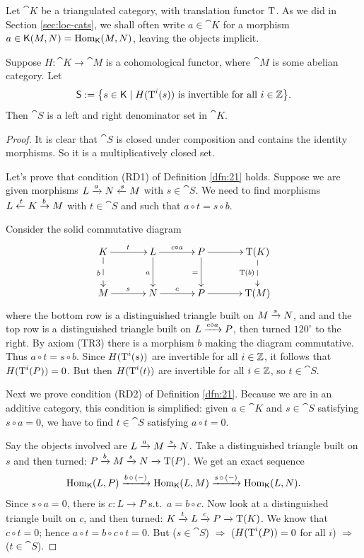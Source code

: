 
Let $\cat{K}$ be a triangulated category, with translation functor $\operatorname{T}$. 
As we did in Section \ref{sec:loc-cats}, we shall often write 
$a \in \cat{K}$ for a morphism 
$a \in \operatorname{\mathsf{K}}(M, N) = \operatorname{Hom}_{\operatorname{\mathsf{K}}}(M, N)$, leaving the objects 
implicit. 

\begin{prop} \label{prop:106}
Suppose 
$H : \cat{K} \to \cat{M}$ is a cohomological functor, where $\cat{M}$ is some
abelian category. Let 
\[ \operatorname{\mathsf{S}} := \bigl\{ s \in \operatorname{\mathsf{K}} \mid H( \operatorname{T}^i(s)) \textup{ is invertible 
for all } i \in \mathbb{Z} \bigr\} . \] 
Then $\cat{S}$ is a left and right denominator set in $\cat{K}$.
\end{prop}

\begin{proof}
It is clear that $\cat{S}$ is closed under composition and contains the
identity morphisms. So it is a multiplicatively closed set. 

Let's prove that condition (RD1) of Definition \ref{dfn:21} holds. Suppose we 
are given morphisms
$L \xrightarrow{a} N \xleftarrow{s} M$ with $s \in \cat{S}$. 
We need to find morphisms 
$L \xleftarrow{t} K \xrightarrow{b} M$ with $t \in \cat{S}$ and such that 
$a \circ t = s \circ b$.  
 
Consider the solid commutative diagram 
\[ \UseTips  \xymatrix @C=8ex @R=6ex { 
K
\ar[r]^{t}
\ar@{-->}[d]_{b}
&
L
\ar[r]^{c \circ a}
\ar[d]_{a}
& 
P
\ar[r]^{}
\ar[d]_{=}
& 
\opn{T}(K) 
\ar@{-->}[d]_{\opn{T}(b)}
\\
M
\ar[r]^{s}
&
N
\ar[r]^{c}
& 
P
\ar[r]^{}
&
\opn{T}(M) 
}  \]
where the bottom row is a distinguished triangle built on $M \xrightarrow{s} N$,
and and the top row is a distinguished triangle built on 
$L \xrightarrow{c \circ a} P$, then turned $120^\circ$ to the right. By axiom (TR3) 
there 
is a morphism $b$ making the diagram commutative. Thus 
$a \circ t = s \circ b$.  Since $H(\operatorname{T}^i(s))$ are
invertible for all $i \in \mathbb{Z}$, it follows that $H(\operatorname{T}^i(P)) = 0$. But 
then $H(\operatorname{T}^i(t))$ are invertible for all $i \in \mathbb{Z}$, so 
$t \in \cat{S}$. 

Next we prove condition (RD2) of Definition \ref{dfn:21}. Because we are in 
an additive category, this condition is simplified: given $a \in \cat{K}$ and 
$s \in \cat{S}$ satisfying 
$s \circ a = 0$, we have to find $t \in \cat{S}$ satisfying 
$a \circ t = 0$. 

Say the objects involved are $L \xrightarrow{a} M \xrightarrow{s} N$. 
Take a distinguished triangle built on $s$ and then turned:
$P \xrightarrow{b} M \xrightarrow{s} N \xrightarrow{} \operatorname{T}(P)$.
We get an exact sequence 
\[ \operatorname{Hom}_{\operatorname{\mathsf{K}}}(L, P) \xrightarrow{b \, \circ \, (-)} 
\operatorname{Hom}_{\operatorname{\mathsf{K}}}(L, M) \xrightarrow{s \, \circ \, (-)} 
\operatorname{Hom}_{\operatorname{\mathsf{K}}}(L, N) . \]
Since $s \circ a = 0$, there is $c : L \to P$ s.t.\ $a = b \circ c$. 
Now look at a distinguished triangle  built on $c$, and then turned:
$K \xrightarrow{t} L \xrightarrow{c} P \xrightarrow{} \operatorname{T}(K)$.
We know that $c \circ t = 0$; hence 
$a \circ t = b \circ c \circ t = 0$. 
But ($s \in \cat{S}$) $\Rightarrow$ ($H(\operatorname{T}^i(P)) = 0$ for all $i$)
$\Rightarrow$ ($t \in \cat{S}$).


\end{proof}
